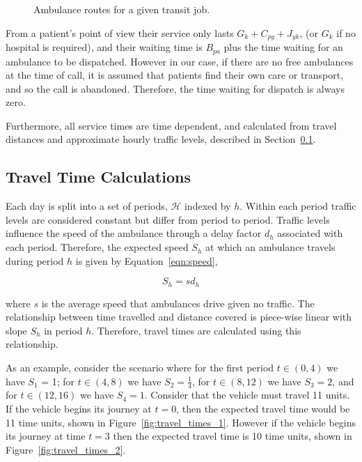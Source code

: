 \documentclass[preprint,12pt]{elsarticle}
\begin{document}
\begin{figure}
    \centering
    
    \caption{Ambulance routes for a given transit job.}
    \label{fig:travel_routes}
\end{figure}

From a patient's point of view their service only lasts $G_k + C_{py} + J_{yk}$,
(or $G_k$ if no hospital is required), and their waiting time is $B_{pa}$ plus
the time waiting for an ambulance to be dispatched. However in our case, if
there are no free ambulances at the time of call, it is assumed that patients
find their own care or transport, and so the call is abandoned. Therefore, the
time waiting for dispatch is always zero.

Furthermore, all service times are time dependent, and calculated from travel
distances and approximate hourly traffic levels, described in
Section~\ref{sec:travel_times}.

\subsection{Travel Time Calculations}\label{sec:travel_times}
Each day is split into a set of periods, $\mathcal{H}$ indexed by $h$. Within
each period traffic levels are considered constant but differ from period to
period. Traffic levels influence the speed of the ambulance through a delay
factor $d_h$ associated with each period. Therefore, the expected speed $S_h$
at which an ambulance travels during period $h$ is given by
Equation~\ref{eqn:speed},

\begin{equation}\label{eqn:speed}
S_h = s d_h
\end{equation}

where $s$ is the average speed that ambulances drive given no traffic. The
relationship between time travelled and distance covered is piece-wise linear
with slope $S_h$ in period $h$. Therefore, travel times are calculated using
this relationship.

As an example, consider the scenario where for the first period $t \in (0, 4)$
we have $S_1$ = 1; for $t \in (4, 8)$ we have $S_2 = \frac{1}{4}$, for
$t \in (8, 12)$ we have $S_3 = 2$, and for $t \in (12, 16)$ we have $S_4 = 1$.
Consider that the vehicle must travel 11 units. If the vehicle begins its
journey at $t=0$, then the expected travel time would be 11 time units, shown
in Figure~\ref{fig:travel_times_1}. However if the vehicle begins its journey
at time $t=3$ then the expected travel time is 10 time units, shown in
Figure~\ref{fig:travel_times_2}.
\end{document}
